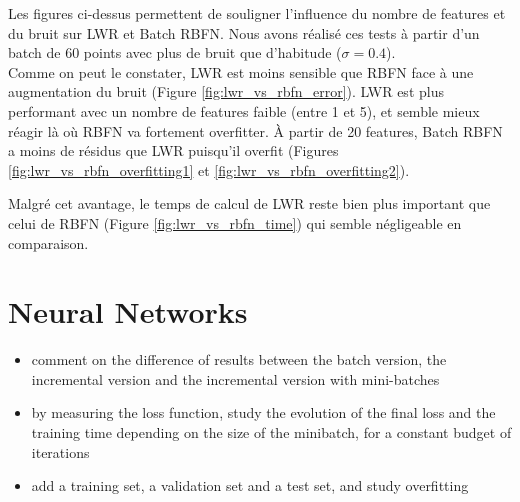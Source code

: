 \documentclass[french,12pt]{article}
\begin{document}
Les figures ci-dessus permettent de souligner l'influence du nombre de features et du bruit sur LWR et Batch RBFN. Nous avons réalisé ces tests à partir d'un batch de 60 points avec plus de bruit que d'habitude ($\sigma = 0.4$).\\
Comme on peut le constater, LWR est moins sensible que RBFN face à une augmentation du bruit (Figure \ref{fig:lwr_vs_rbfn_error}). LWR est plus performant avec un nombre de features faible (entre 1 et 5), et semble mieux réagir  là où RBFN va fortement overfitter.
\`A partir de 20 features, Batch RBFN a moins de résidus que LWR puisqu'il overfit (Figures \ref{fig:lwr_vs_rbfn_overfitting1} et \ref{fig:lwr_vs_rbfn_overfitting2}).

Malgré cet avantage, le temps de calcul de LWR reste bien plus important que celui de RBFN (Figure \ref{fig:lwr_vs_rbfn_time}) qui semble négligeable en comparaison.

\newpage
\section{Neural Networks}

\begin{itemize}
		\item comment on the difference of results between the batch version, the incremental version and the incremental version with mini-batches
		\item by measuring the loss function, study the evolution of the final loss and the training time depending on the size of the minibatch, for a constant budget of iterations
		\item add a training set, a validation set and a test set, and study overfitting
\end{itemize}
\bigskip
\end{document}
